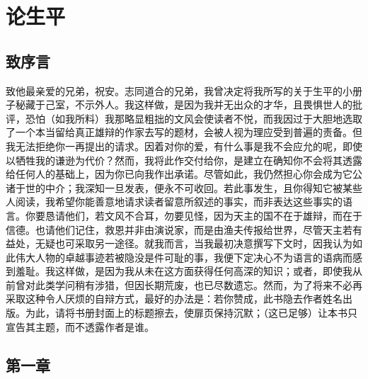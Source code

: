 
\chapter{论生平}



\section{致序言}

致他最亲爱的兄弟，祝安。志同道合的兄弟，我曾决定将我所写的关于生平的小册子秘藏于己室，不示外人。我这样做，是因为我并无出众的才华，且畏惧世人的批评，恐怕（如我所料）我那略显粗拙的文风会使读者不悦，而我因过于大胆地选取了一个本当留给真正雄辩的作家去写的题材，会被人视为理应受到普遍的责备。但我无法拒绝你一再提出的请求。因着对你的爱，有什么事是我不会应允的呢，即使以牺牲我的谦逊为代价？然而，我将此作交付给你，是建立在确知你不会将其透露给任何人的基础上，因为你已向我作出承诺。尽管如此，我仍然担心你会成为它公诸于世的中介；我深知一旦发表，便永不可收回。若此事发生，且你得知它被某些人阅读，我希望你能善意地请求读者留意所叙述的事实，而非表达这些事实的语言。你要恳请他们，若文风不合耳，勿要见怪，因为天主的国不在于雄辩，而在于信德。也请他们记住，救恩并非由演说家，而是由渔夫传报给世界，尽管天主若有益处，无疑也可采取另一途径。就我而言，当我最初决意撰写下文时，因我认为如此伟大人物的卓越事迹若被隐没是件可耻的事，我便下定决心不为语言的语病而感到羞耻。我这样做，是因为我从未在这方面获得任何高深的知识；或者，即使我从前曾对此类学问稍有涉猎，但因长期荒废，也已尽数遗忘。然而，为了将来不必再采取这种令人厌烦的自辩方式，最好的办法是：若你赞成，此书隐去作者姓名出版。为此，请将书册封面上的标题擦去，使扉页保持沉默；（这已足够）让本书只宣告其主题，而不透露作者是谁。\par


\section{第一章}

